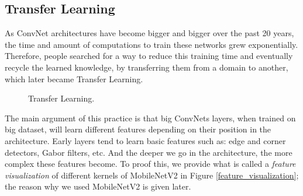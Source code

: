 \documentclass[12pt, a4paper]{report}
\begin{document}
			\subsection{Transfer Learning}
				As ConvNet architectures have become bigger and bigger over the past 20 years, the time and amount of computations to train these networks grew exponentially.
				Therefore, people searched for a way to reduce this training time and eventually recycle the learned knowledge, by transferring them from a domain to another, which later became Transfer Learning.
				\begin{figure}[h!]
					\centering
					\caption{Transfer Learning.}
				\end{figure}
				The main argument of this practice is that big ConvNets layers, when trained on big dataset, will learn different features depending on their position in the architecture.
				Early layers tend to learn basic features such as: edge and corner detectors, Gabor filters, etc.
				And the deeper we go in the architecture, the more complex these features become.
				To proof this, we provide what is called a {\itshape feature visualization} of different kernels of MobileNetV2 in Figure \ref{feature_visualization}; the reason why we used MobileNetV2 is given later.
\end{document}
